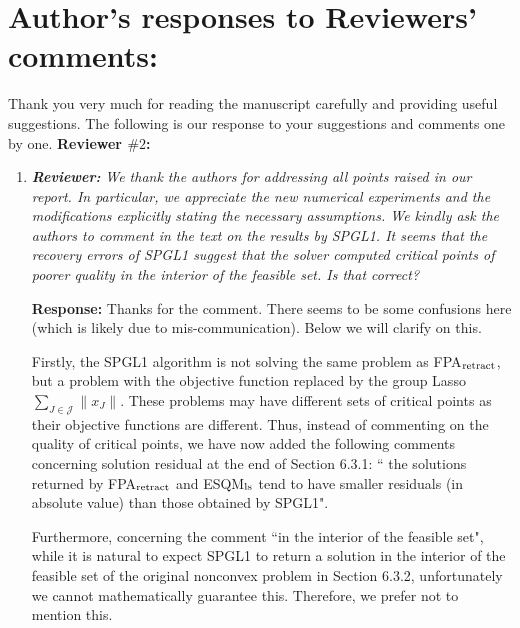 \documentclass{article}
\begin{document}
\section*{Author's responses to Reviewers' comments:}
Thank you very much for reading the manuscript carefully and providing useful suggestions. The following is our response to your suggestions and comments one by one.
\textbf{Reviewer $\# 2$:}
\begin{enumerate}
        \item \textit{\textbf{Reviewer:}} \textit{ We thank the authors for addressing all points raised in our report. In particular, we appreciate the new numerical experiments and the modifications explicitly stating the necessary assumptions. We kindly ask the authors to comment in the text on the results by SPGL1. It seems that the recovery errors of SPGL1 suggest that the solver computed critical points of poorer quality in the interior of the feasible set. Is that correct?}

        \textbf{Response:} Thanks for the comment. There seems to be some confusions here (which is likely due to mis-communication). Below we will clarify on this.

Firstly, the SPGL1 algorithm is not solving the same problem as FPA$_{\rm retract}$, but a problem with the objective function replaced by the group Lasso $\sum\limits_{J\in\mathcal{J}}\|x_J\|$. These problems may have different sets of critical points as their objective functions are different. Thus, instead of commenting on the quality of critical points, we have now added the following comments concerning solution residual at the end of Section 6.3.1: `` the solutions returned by FPA$_{\rm retract}$ and
{\rm ESQM}$_{\rm ls}$ tend to have smaller residuals (in absolute value) than those obtained by SPGL1".

Furthermore, concerning the comment ``in the interior of the feasible set", while
it is natural to expect SPGL1 to return a solution in the interior of the feasible set of the original nonconvex problem in Section 6.3.2, unfortunately we cannot mathematically guarantee this. %
Therefore, we prefer
not to mention this.


\end{enumerate}
\end{document}
